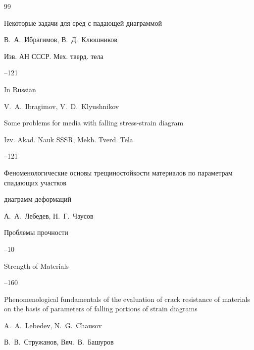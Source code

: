 \begin{thebibliography}{99}




\paper Некоторые задачи для сред с падающей диаграммой

\by В.~А.~Ибрагимов, В.~Д.~Клюшников

\jour Изв. АН СССР. Мех. тверд. тела



--121

\misctransl

\lang In Russian

\by V.~A.~Ibragimov, V.~D.~Klyushnikov

\paper Some problems for media with falling stress-strain diagram 

\jour Izv. Akad. Nauk SSSR, Mekh. Tverd. Tela



--121




\paper Феноменологические основы трещиностойкости материалов по параметрам спадающих участков

диаграмм деформаций

\by А.~А.~Лебедев, Н.~Г.~Чаусов

\jour Проблемы прочности



--10

\transl


\jour Strength of Materials




--160

\paper Phenomenological fundamentals of the evaluation of crack resistance of materials on the basis of parameters of falling portions of strain diagrams

\by A.~A.~Lebedev, N.~G.~Chausov 




\by В.~В.~Стружанов, Вяч.~В.~Башуров


\end{thebibliography}
